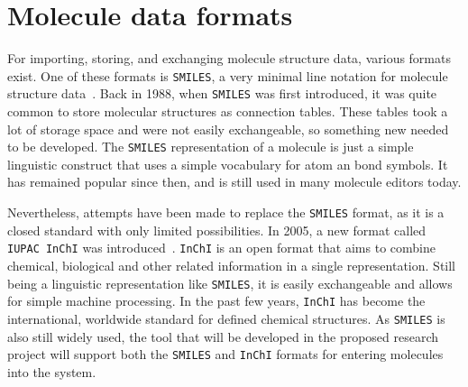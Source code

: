 \section{Molecule data formats}

For importing, storing, and exchanging molecule structure data, various formats exist. One of these formats is \verb|SMILES|, a very minimal line notation for molecule structure data~\cite{daylight1992daylight}. Back in 1988, when \verb|SMILES| was first introduced, it was quite common to store molecular structures as connection tables. These tables took a lot of storage space and were not easily exchangeable, so something new needed to be developed. The \verb|SMILES| representation of a molecule is just a simple linguistic construct that uses a simple vocabulary for atom an bond symbols. It has remained popular since then, and is still used in many molecule editors today.

Nevertheless, attempts have been made to replace the \verb|SMILES| format, as it is a closed standard with only limited possibilities. In 2005, a new format called \verb|IUPAC InChI| was introduced~\cite{heller2013inchi}. \verb|InChI| is an open format that aims to combine chemical, biological and other related information in a single representation. Still being a linguistic representation like \verb|SMILES|, it is easily exchangeable and allows for simple machine processing. In the past few years, \verb|InChI| has become the international, worldwide standard for defined chemical structures. As \verb|SMILES| is also still widely used, the tool that will be developed in the proposed research project will support both the \verb|SMILES| and \verb|InChI| formats for entering molecules into the system.
